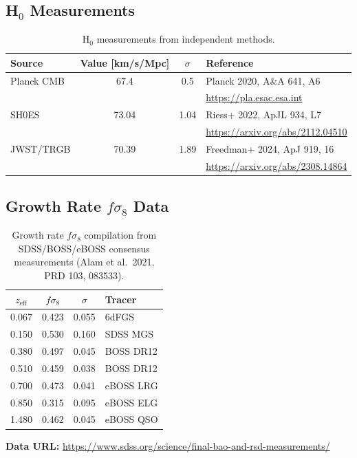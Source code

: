 \documentclass[11pt]{article}
\begin{document}
\subsection{H$_0$ Measurements}

\begin{table}[h]
\centering
\begin{tabular}{lccp{5cm}}
\toprule
Source & Value [km/s/Mpc] & $\sigma$ & Reference \\
\midrule
Planck CMB & 67.4 & 0.5 & Planck 2020, A\&A 641, A6 \\
 & & & \url{https://pla.esac.esa.int} \\
\midrule
SH0ES & 73.04 & 1.04 & Riess+ 2022, ApJL 934, L7 \\
 & & & \url{https://arxiv.org/abs/2112.04510} \\
\midrule
JWST/TRGB & 70.39 & 1.89 & Freedman+ 2024, ApJ 919, 16 \\
 & & & \url{https://arxiv.org/abs/2308.14864} \\
\bottomrule
\end{tabular}
\caption{H$_0$ measurements from independent methods.}
\end{table}

\subsection{Growth Rate $f\sigma_8$ Data}

\begin{table}[h]
\centering
\begin{tabular}{cccp{4cm}}
\toprule
$z_{\text{eff}}$ & $f\sigma_8$ & $\sigma$ & Tracer \\
\midrule
0.067 & 0.423 & 0.055 & 6dFGS \\
0.150 & 0.530 & 0.160 & SDSS MGS \\
0.380 & 0.497 & 0.045 & BOSS DR12 \\
0.510 & 0.459 & 0.038 & BOSS DR12 \\
0.700 & 0.473 & 0.041 & eBOSS LRG \\
0.850 & 0.315 & 0.095 & eBOSS ELG \\
1.480 & 0.462 & 0.045 & eBOSS QSO \\
\bottomrule
\end{tabular}
\caption{Growth rate $f\sigma_8$ compilation from SDSS/BOSS/eBOSS consensus measurements (Alam et al.\ 2021, PRD 103, 083533).}
\end{table}

\noindent\textbf{Data URL:} \url{https://www.sdss.org/science/final-bao-and-rsd-measurements/}
\end{document}
